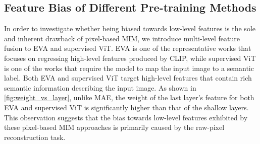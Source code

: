 \subsection{Feature Bias of Different Pre-training Methods}
\label{sec:proprietary}

In order to investigate whether being biased towards low-level features is the sole and inherent drawback of pixel-based MIM, we introduce multi-level feature fusion to EVA\cite{EVA} and supervised ViT\cite{MAE}. EVA is one of the representative works that focuses on regressing high-level features produced by CLIP\cite{CLIP}, while supervised ViT is one of the works that require the model to map the input image to a semantic label. Both EVA and supervised ViT target high-level features that contain rich semantic information describing the input image. As shown in \autoref{fig:weight_vs_layer}, unlike MAE, the weight of the last layer's feature for both EVA and supervised ViT is significantly higher than that of the shallow layers. This observation suggests that the bias towards low-level features exhibited by these pixel-based MIM approaches is primarily caused by the raw-pixel reconstruction task.

